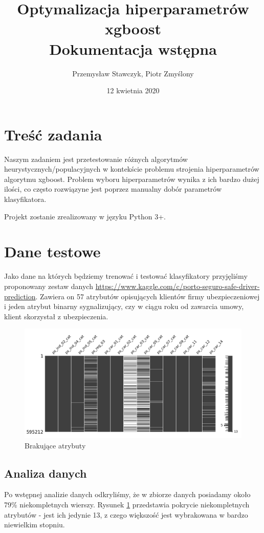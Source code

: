 \documentclass[11pt]{article}
\title{Optymalizacja hiperparametrów xgboost\\
	\large Dokumentacja wstępna}
\author{Przemysław Stawczyk, Piotr Zmyślony}
\date{12 kwietnia 2020} %
\begin{document}
	\maketitle
	\setcounter{secnumdepth}{3}
	\setcounter{tocdepth}{3}
	\tableofcontents
	\clearpage

\section{Treść zadania}
Naszym zadaniem jest przetestowanie różnych algorytmów heurystycznych/populacyjnych w kontekście problemu strojenia hiperparametrów algorytmu xgboost. Problem wyboru hiperparametrów wynika z ich bardzo dużej ilości, co często rozwiązyne jest poprzez manualny dobór parametrów klasyfikatora.

Projekt zostanie zrealizowany w języku Python 3+.
\section{Dane testowe}
Jako dane na których będziemy trenować i testować klasyfikatory przyjęliśmy proponowany zestaw danych \url{https://www.kaggle.com/c/porto-seguro-safe-driver-prediction}. Zawiera on 57 atrybutów opisujących klientów firmy ubezpieczeniowej i jeden atrybut binarny sygnalizujący, czy w ciągu roku od zawarcia umowy, klient skorzystał z ubezpieczenia.

\begin{figure}[H]
	\caption{Brakujące atrybuty}
	\label{attrib_analysis}
	\centering
	\includegraphics[width=\textwidth]{attrib_analysis}
\end{figure}

\subsection{Analiza danych}
Po wstępnej analizie danych odkryliśmy, że w zbiorze danych posiadamy około 79\% niekompletnych wierszy. Rysunek \ref{attrib_analysis} przedstawia pokrycie niekompletnych atrybutów - jest ich jedynie 13, z czego większość jest wybrakowana w bardzo niewielkim stopniu.
\end{document}
